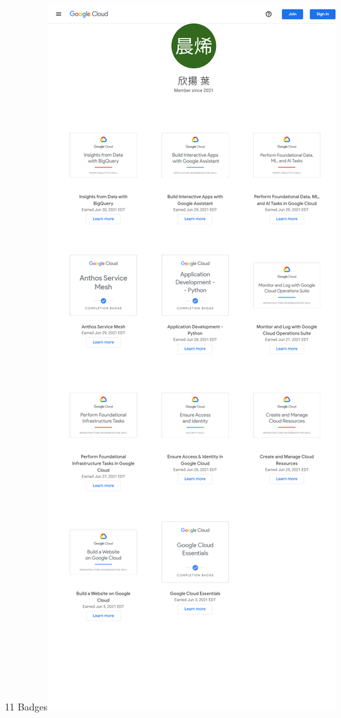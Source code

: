 \begin{cventries}
  \cventry
    {11 Badges\linebreak[1]\includegraphics[scale=0.3, left]{gcp.png}}
    {\href{https://www.cloudskillsboost.google/public_profiles/1bfb275d-a0a0-4fa0-9c5c-3aa34a697132}{\color{hyperlink}{Google Cloud Jam 2021(link)}}}
    {}{}{}


\end{cventries}
